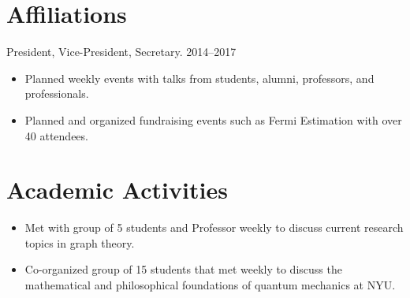 \documentclass{cultvoucher}
\begin{document}



\section{Affiliations}



         {{\small{President, Vice-President, Secretary.}}}
         {2014--2017}
\begin{itemize}
      \item Planned weekly events with talks from students, alumni, professors,
            and professionals.
      \item Planned and organized fundraising events such as Fermi Estimation
            with over 40 attendees.
\end{itemize}

\section{Academic Activities}
\begin{itemize}
    \item Met with group of 5 students and Professor weekly to discuss current
          research topics in graph theory.
\end{itemize}

\begin{itemize}
    \item Co-organized group of 15 students that met weekly to discuss the
          mathematical and philosophical foundations of quantum mechanics at
          NYU.
\end{itemize}
\end{document}
